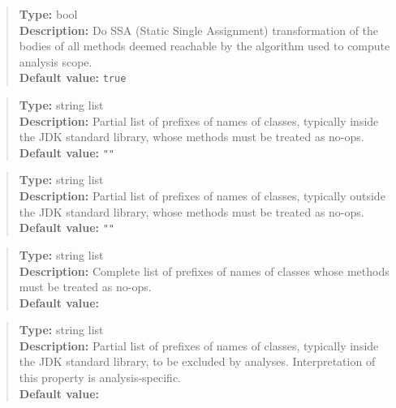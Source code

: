 \begin{quote}
{\bf Type:} bool  \\
{\bf Description:} Do SSA (Static Single Assignment) transformation of the bodies of all methods deemed reachable by the algorithm used to compute analysis scope. \\
{\bf Default value:} {\tt true}
\end{quote}


\begin{quote}
{\bf Type:} string list \\
{\bf Description:} Partial list of prefixes of names of classes, typically inside the JDK standard library, whose methods must be treated as no-ops. \\
{\bf Default value:} {\tt ""}
\end{quote}

\begin{quote}
{\bf Type:} string list \\
{\bf Description:} Partial list of prefixes of names of classes, typically outside the JDK standard library, whose methods must be treated as no-ops. \\
{\bf Default value:} {\tt ""}
\end{quote}

\begin{quote}
{\bf Type:} string list \\
{\bf Description:} Complete list of prefixes of names of classes whose methods must be treated as no-ops. \\
{\bf Default value:} 
\end{quote}

\begin{quote}
{\bf Type:} string list \\
{\bf Description:} Partial list of prefixes of names of classes, typically inside the JDK standard library, to be excluded by analyses.  Interpretation of this property is analysis-specific. \\
{\bf Default value:} 
\end{quote}

